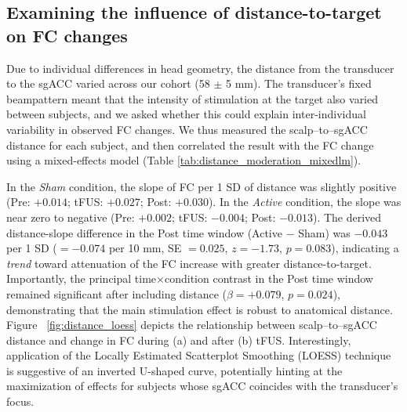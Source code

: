 \subsection*{Examining the influence of distance-to-target on FC changes}
\noindent
Due to individual differences in head geometry, the distance from the transducer to the sgACC varied across our cohort (58 $\pm$ 5 mm). The transducer's fixed beampattern meant that the intensity of stimulation at the target also varied between subjects, and we asked whether this could explain inter-individual variability in observed FC changes. We thus measured the scalp--to--sgACC distance for each subject, and then correlated the result with the FC change using a mixed-effects model (Table \ref{tab:distance_moderation_mixedlm}).

In the \emph{Sham} condition, the slope of FC per 1 SD of distance was slightly positive (Pre: $+0.014$; tFUS: $+0.027$; Post: $+0.030$). In the \emph{Active} condition, the slope was near zero to negative (Pre: $+0.002$; tFUS: $-0.004$; Post: $-0.013$). The derived distance-slope difference in the Post time window (Active $-$ Sham) was $-0.043$ per 1 SD ($= -0.074$ per 10 mm, SE $=0.025$, $z=-1.73$, $p=0.083$), indicating a \emph{trend} toward attenuation of the FC increase with greater distance-to-target. Importantly, the principal time$\times$condition contrast in the Post time window remained significant after including distance ($\beta=+0.079$, $p=0.024$), demonstrating that the main stimulation effect is robust to anatomical distance. Figure ~\ref{fig:distance_loess} depicts the relationship between scalp--to--sgACC distance and change in FC during (a) and after (b) tFUS. Interestingly, application of the Locally Estimated Scatterplot Smoothing (LOESS) technique is suggestive of an inverted U-shaped curve, potentially hinting at the maximization of effects for subjects whose sgACC coincides with the transducer's focus. 


